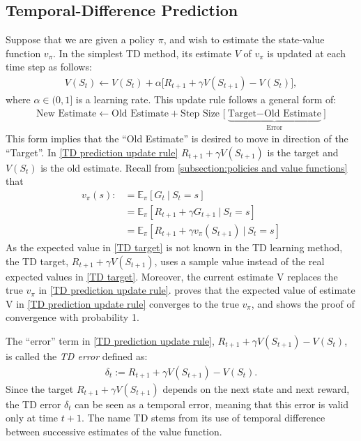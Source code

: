\subsection{Temporal-Difference Prediction}
\label{TD learning}
Suppose that we are given a policy $\pi$, and wish to estimate the state-value function $v_\pi$. In the simplest TD method, its estimate $V$ of $v_\pi$ is updated at each time step as follows:
\begin{align}
\label{TD prediction update rule}
    V(S_t) \leftarrow V(S_t) + \alpha \big[ R_{t+1} + \gamma V(S_{t+1}) - V(S_t) \big],
\end{align}
where $\alpha \in (0,1]$ is a learning rate. This update rule follows a general form of:
\begin{align}
\label{update_rule}
    \text{New Estimate} \leftarrow \text{Old Estimate} + \text{Step Size } \big[ \underbrace{\text{Target} - \text{Old Estimate}}_\text{Error}\big]
\end{align}
This form implies that the ``Old Estimate'' is desired to move in direction of the ``Target''.  In \eqref{TD prediction update rule} $R_{t+1} + \gamma V(S_{t+1})$ is the target and $V(S_t)$ is the old estimate. Recall from \autoref{subsection:policies and value functions} that
\begin{align}
    v_\pi(s) :&= \mathbb{E}_\pi\left[G_t \ | \ S_t = s\right]\nonumber\\
    &= \mathbb{E}_\pi\left[R_{t+1} + \gamma G_{t+1} \ | \ S_t = s\right] \nonumber\\
    &= \mathbb{E}_\pi\left[R_{t+1} + \gamma v_\pi(S_{t+1}) \ | \ S_t = s\right] \label{TD target}
\end{align}
As the expected value in \eqref{TD target} is not known in the TD learning method, the TD target, $R_{t+1} + \gamma V(S_{t+1})$, uses a sample value instead of the real expected values in \eqref{TD target}. Moreover, the current estimate V replaces the true $v_\pi$ in \eqref{TD prediction update rule}. \citeauthor{sutton1988learning} \cite{sutton1988learning} proves that the expected value of estimate V in \eqref{TD prediction update rule} converges to the true $v_\pi$, and \citeauthor{dayan1992convergence} \cite{dayan1992convergence} shows the proof of convergence with probability 1.

The ``error'' term in \eqref{TD prediction update rule}, $R_{t+1} + \gamma V(S_{t+1}) - V(S_t)$, is called the \textit{TD error} defined as:
\begin{align}
    \delta_t := R_{t+1} + \gamma V(S_{t+1}) - V(S_t).
\end{align}
Since the target $R_{t+1} + \gamma V(S_{t+1})$ depends on the next state and next reward, the TD error $\delta_t$ can be seen as a temporal error, meaning that this error is valid only at time $t+1$. The name TD stems from its use of temporal difference between successive estimates of the value function.

